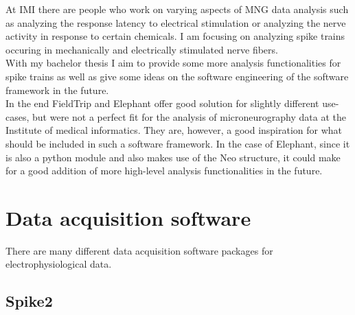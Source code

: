 At IMI there are people who work on varying aspects of MNG data analysis such as analyzing the response latency to electrical stimulation or analyzing the nerve activity in response to certain chemicals. I am focusing on analyzing spike trains occuring in mechanically and electrically stimulated nerve fibers.\\
With my bachelor thesis I aim to provide some more analysis functionalities for spike trains as well as give some ideas on the software engineering of the software framework in the future.\\
In the end FieldTrip and Elephant offer good solution for slightly different use-cases, but were not a perfect fit for the analysis of microneurography data at the Institute of medical informatics. They are, however, a good inspiration for what should be included in such a software framework. In the case of Elephant, since it is also a python module and also makes use of the Neo structure, it could make for a good addition of more high-level analysis functionalities in the future.



\section{Data acquisition software} 
There are many different data acquisition software packages for electrophysiological data. 

\subsection{Spike2}

